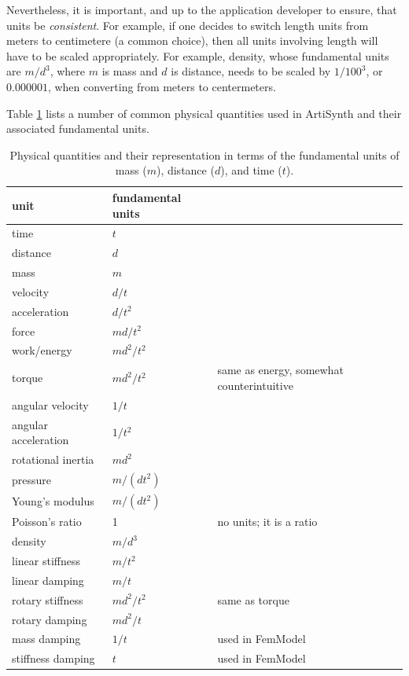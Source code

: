 Nevertheless, it is important, and up to the application developer to
ensure, that units be {\it consistent}. For example, if one decides to
switch length units from meters to centimetere (a common choice),
then all units involving length will have to be scaled appropriately.
For example, density, whose fundamental units are $m/d^3$, where $m$ is mass and
$d$ is distance, needs to be scaled by $1/100^3$, or $0.000001$, when
converting from meters to centermeters.

Table \ref{Units:tab} lists a number of common physical quantities
used in ArtiSynth and their associated fundamental units.

\begin{table}
\begin{center}
\begin{tabular}{|lll|}
\hline
unit & fundamental units & \\
\hline
time                    & $t$ & \\
distance                & $d$ & \\
mass                    & $m$ & \\
velocity                & $d/t$ & \\
acceleration            & $d/t^2$ & \\
force                   & $m d/t^2$ & \\
work/energy             & $m d^2/t^2$& \\
torque                  & $m d^2/t^2$ & same as energy, somewhat counterintuitive \\
angular velocity        & $1/t$ & \\
angular acceleration    & $1/t^2$ & \\
rotational inertia      & $m d^2$ & \\
pressure                & $m/(d t^2)$ & \\
Young's modulus         & $m/(d t^2)$ & \\
Poisson's ratio         & 1 & no units; it is a ratio \\
density                 & $m/d^3$ & \\
linear stiffness        & $m/t^2$ & \\
linear damping          & $m/t$ & \\
rotary stiffness        & $m d^2/t^2$ & same as torque \\
rotary damping          & $m d^2/t$ & \\
mass damping            & $1/t$ & used in FemModel \\
stiffness damping       & $t$ & used in FemModel \\
\hline
\end{tabular}
\end{center}
\caption{Physical quantities and their representation in terms of the
fundamental units of mass ($m$), distance ($d$), and time ($t$).}
\label{Units:tab}
\end{table}

